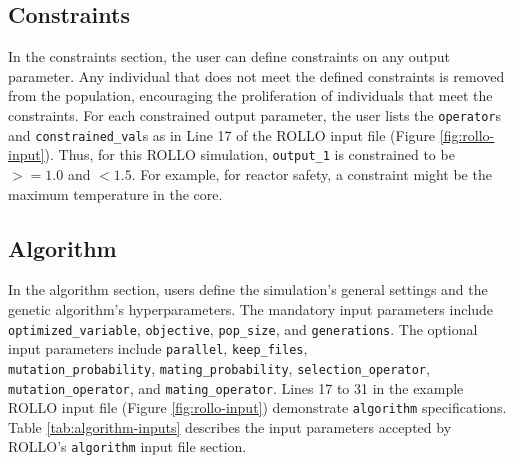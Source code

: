 \subsection{Constraints}
In the constraints section, the user can define constraints on any output parameter. 
Any individual that does not meet the defined constraints is removed from the 
population, encouraging the proliferation of individuals that meet the 
constraints. 
For each constrained output parameter, the user lists the \texttt{operator}s 
and \texttt{constrained\_val}s as in Line 17 of the \gls{ROLLO} input file 
(Figure \ref{fig:rollo-input}). 
Thus, for this \gls{ROLLO} simulation, \texttt{output\_1} is constrained to be 
$>= 1.0$ and $< 1.5$. 
For example, for reactor safety, a constraint might be the maximum temperature in the 
core.

\subsection{Algorithm}
In the algorithm section, users define the simulation's general settings and the
genetic algorithm's hyperparameters. 
The mandatory input parameters include \texttt{optimized\_variable}, \texttt{objective},
\texttt{pop\_size}, and \texttt{generations}.
The optional input parameters include \texttt{parallel}, \texttt{keep\_files}, \\
\texttt{mutation\_probability}, \texttt{mating\_probability}, 
\texttt{selection\_operator}, \texttt{mutation\_operator}, 
and \texttt{mating\_operator}. 
Lines 17 to 31 in the example \gls{ROLLO} input file (Figure \ref{fig:rollo-input}) 
demonstrate \texttt{algorithm} specifications. 
Table \ref{tab:algorithm-inputs} describes the input parameters accepted by
ROLLO's \texttt{algorithm} input file section.  
